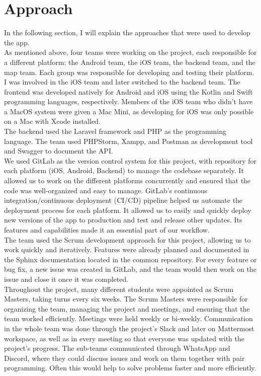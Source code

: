 \documentclass[sf-font,usefira,english]{uulm/sp/article}
\begin{document}
\section{Approach}

In the following section, I will explain the approaches that were used to develop the app.\\

As mentioned above, four teams were working on the project, each responsible for a different platform:
the Android team, the iOS team, the backend team, and the map team.
Each group was responsible for developing and testing their platform.\\

I was involved in the iOS team and later switched to the backend team.
The frontend was developed natively for Android and iOS using the Kotlin and Swift programming languages, respectively.
Members of the iOS team who didn’t have a MacOS system were given a Mac Mini, as developing for iOS was only possible on a Mac with Xcode installed.\\
The backend used the Laravel framework and PHP as the programming language.
The team used PHPStorm, Xampp, and Postman as development tool and Swagger to document the API.\\

We used GitLab as the version control system for this project, with repository for each platform (iOS, Android, Backend) to manage the codebase separately.
It allowed us to work on the different platforms concurrently and ensured that the code was well-organized and easy to manage.
GitLab’s continuous integration/continuous deployment (CI/CD) pipeline helped us automate the deployment process for each platform.
It allowed us to easily and quickly deploy new versions of the app to production and test and release other updates.
Its features and capabilities made it an essential part of our workflow.\\

The team used the Scrum development approach for this project, allowing us to work quickly and iteratively.
Features were already planned and documented in the Sphinx documentation located in the common repository.
For every feature or bug fix, a new issue was created in GitLab, and the team would then work on the issue and close it once it was completed.\\

Throughout the project, many different students were appointed as Scrum Masters, taking turns every six weeks.
The Scrum Masters were responsible for organizing the team, managing the project and meetings, and ensuring that the team worked efficiently.
Meetings were held weekly or bi-weekly.
Communication in the whole team was done through the project's Slack and later on Mattermost workspace, as well as in every meeting so that everyone was updated with the project's progress.
The sub-teams communicated through WhatsApp and Discord, where they could discuss issues and work on them together with pair programming.
Often this would help to solve problems faster and more efficiently.
\end{document}
